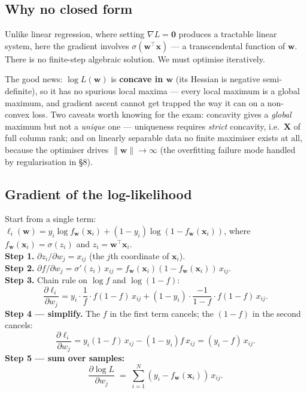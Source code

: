 \documentclass[11pt, a4paper]{article}
\newcommand{\doflag}{\textcolor{defBd}{\textbf{[DO]}}\,}
\begin{document}
\subsection{Why no closed form}

Unlike linear regression, where setting $\nabla L = \mathbf{0}$ produces a tractable linear system, here the gradient involves $\sigma(\mathbf{w}^\top\mathbf{x})$ — a transcendental function of $\mathbf{w}$. There is no finite-step algebraic solution. We must optimise iteratively.

The good news: $\log L(\mathbf{w})$ is \textbf{concave in $\mathbf{w}$} (its Hessian is negative semi-definite), so it has no spurious local maxima --- every local maximum is a global maximum, and gradient ascent cannot get trapped the way it can on a non-convex loss. Two caveats worth knowing for the exam: concavity gives a \emph{global} maximum but not a \emph{unique} one --- uniqueness requires \emph{strict} concavity, i.e.\ $\mathbf{X}$ of full column rank; and on linearly separable data no finite maximiser exists at all, because the optimiser drives $\|\mathbf{w}\|\to\infty$ (the overfitting failure mode handled by regularisation in \S8).

\subsection{Gradient of the log-likelihood}

\begin{exbox}[\doflag{}Compute $\partial \log L / \partial w_j$]
Start from a single term: $\ell_i(\mathbf{w}) = y_i\log f_\mathbf{w}(\mathbf{x}_i) + (1-y_i)\log(1-f_\mathbf{w}(\mathbf{x}_i))$, where $f_\mathbf{w}(\mathbf{x}_i) = \sigma(z_i)$ and $z_i = \mathbf{w}^\top\mathbf{x}_i$.\\[0.3em]
\textbf{Step 1.} $\partial z_i/\partial w_j = x_{ij}$ (the $j$th coordinate of $\mathbf{x}_i$).\\
\textbf{Step 2.} $\partial f/\partial w_j = \sigma'(z_i)\,x_{ij} = f_\mathbf{w}(\mathbf{x}_i)(1-f_\mathbf{w}(\mathbf{x}_i))\,x_{ij}$.\\
\textbf{Step 3.} Chain rule on $\log f$ and $\log(1-f)$:
\[
\frac{\partial\ell_i}{\partial w_j} = y_i\cdot\frac{1}{f}\cdot f(1-f)\,x_{ij} + (1-y_i)\cdot\frac{-1}{1-f}\cdot f(1-f)\,x_{ij}.
\]
\textbf{Step 4 — simplify.} The $f$ in the first term cancels; the $(1-f)$ in the second cancels:
\[
\frac{\partial\ell_i}{\partial w_j} = y_i(1-f)\,x_{ij} - (1-y_i)f\,x_{ij} = (y_i - f)\,x_{ij}.
\]
\textbf{Step 5 — sum over samples:}
\[
\frac{\partial\log L}{\partial w_j} \;=\; \sum_{i=1}^N (y_i - f_\mathbf{w}(\mathbf{x}_i))\,x_{ij}.
\]
\end{exbox}
\end{document}
